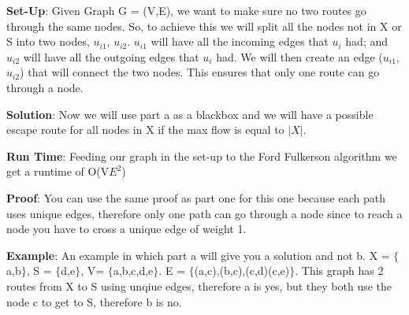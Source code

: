 \documentclass{article}
\begin{document}
{\textbf{Set-Up}: Given Graph G = (V,E), we want to make sure no two routes
go through the same nodes.  So, to achieve this we will split all the nodes not in
X or S into two nodes, $u_{i1}$, $u_{i2}$.  $u_{i1}$ will have all the incoming edges that $u_{i}$
had; and $u_{i2}$ will have all the outgoing edges that $u_{i}$ had.  We will then create an
edge ($u_{i1}$, $u_{i2}$) that will connect the two nodes.  This ensures that only one route can go
through a node.  \newline

\textbf{Solution}: Now we will use part a as a blackbox and we will have a possible
escape route for all nodes in X if the max flow is equal to $|{X}|$. \newline

\textbf{Run Time}:  Feeding our graph in the set-up to the Ford Fulkerson algorithm we get a runtime of
O(V$E^{2}$) \newline

\par}

\textbf{Proof}: You can use the same proof as part one for this one because each path
uses unique edges, therefore only one path can go through a node since to reach a node you have
to cross a unique edge of weight 1. \newline

\textbf{Example}: An example in which part a will give you a solution and not b.
X = $\{$a,b$\}$, S = $\{$d,e$\}$, V= $\{$a,b,c,d,e$\}$.  E = $\{$(a,c),(b,c),(c,d)(c,e)$\}$.  This graph
has 2 routes from X to S using unqiue edges, therefore a is yes, but they both use the
node c to get to S, therefore b is no.
\end{document}
